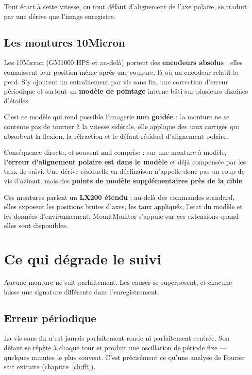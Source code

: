 Tout écart à cette vitesse, ou tout défaut d'alignement de l'axe polaire, se
traduit par une dérive que l'image enregistre.

\section{Les montures 10Micron}

Les 10Micron (GM1000 HPS et au-delà) portent des \textbf{encodeurs absolus} :
elles connaissent leur position même après une coupure, là où un encodeur
relatif la perd. S'y ajoutent un entraînement par vis sans fin, une correction
d'erreur périodique et surtout un \textbf{modèle de pointage} interne bâti sur
plusieurs dizaines d'étoiles.

C'est ce modèle qui rend possible l'imagerie \textbf{non guidée} : la monture
ne se contente pas de tourner à la vitesse sidérale, elle applique des taux
corrigés qui absorbent la flexion, la réfraction et le défaut résiduel
d'alignement polaire.

\begin{warning}
Conséquence directe, et souvent mal comprise : sur une monture à modèle,
\textbf{l'erreur d'alignement polaire est dans le modèle} et déjà compensée par
les taux de suivi. Une dérive résiduelle en déclinaison n'appelle donc pas un
coup de vis d'azimut, mais des \textbf{points de modèle supplémentaires près de
la cible}.
\end{warning}

Ces montures parlent un \textbf{LX200 étendu} : au-delà des commandes standard,
elles exposent les positions brutes d'axes, les taux appliqués, l'état du
modèle et les données d'environnement. MountMonitor s'appuie sur ces
extensions quand elles sont disponibles.

\chapter{Ce qui dégrade le suivi}
\label{ch:errors}

Aucune monture ne suit parfaitement. Les causes se superposent, et chacune
laisse une signature différente dans l'enregistrement.

\section{Erreur périodique}

La vis sans fin n'est jamais parfaitement ronde ni parfaitement centrée. Son
défaut se répète à chaque tour et produit une oscillation de période fixe ---
quelques minutes le plus souvent. C'est précisément ce qu'une analyse de
Fourier sait extraire (chapitre~\ref{ch:fft}).

